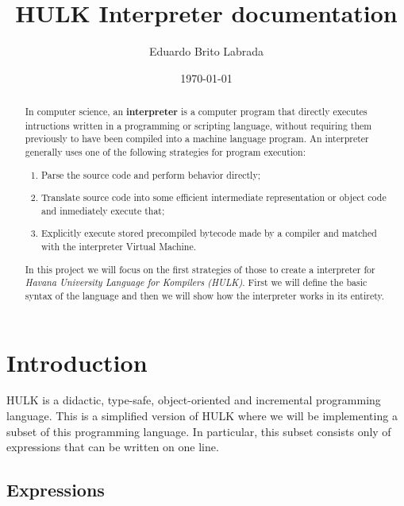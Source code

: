 \documentclass[a4paper, 12pt]{report}
\begin{document}
\title{\bf HULK Interpreter documentation}
\author{Eduardo Brito Labrada}
\date{\today}
\maketitle

\begin{abstract}
  In computer science, an {\bf interpreter} is a computer program that directly executes
  intructions written in a programming or scripting language, without requiring them previously
  to have been compiled into a machine language program. An interpreter generally uses one of the
  following strategies for program execution:

  \begin{enumerate}
    \item Parse the source code and perform behavior directly;
    \item Translate source code into some efficient intermediate representation or object code
          and inmediately execute that;
    \item Explicitly execute stored precompiled bytecode made by a compiler and matched with the
          interpreter Virtual Machine.
  \end{enumerate}

  In this project we will focus on the first strategies of those to create a interpreter for
    {\em Havana University Language for Kompilers (HULK)}. First we will define the basic syntax of the
  language and then we will show how the interpreter works in its entirety.
\end{abstract}

\tableofcontents

\newpage

\section*{Introduction}

HULK is a didactic, type-safe, object-oriented and incremental programming language. This is a simplified 
version of HULK where we will be implementing a subset of this programming language. In particular, this 
subset consists only of expressions that can be written on one line. 

\subsection*{Expressions}
\end{document}
